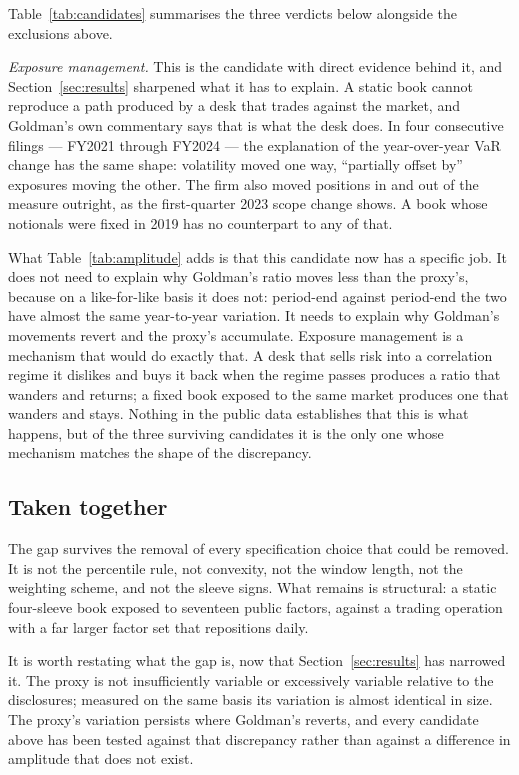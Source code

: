 Table~\ref{tab:candidates} summarises the three verdicts below alongside the
exclusions above.

\emph{Exposure management.} This is the candidate with direct evidence behind
it, and Section~\ref{sec:results} sharpened what it has to explain. A static
book cannot reproduce a path produced by a desk that trades against the market,
and Goldman's own commentary says that is what the desk does. In four
consecutive filings --- FY2021 through FY2024 --- the explanation of the
year-over-year VaR change has the same shape: volatility moved one way,
``partially offset by'' exposures moving the other. The firm also moved
positions in and out of the measure outright, as the first-quarter 2023 scope
change shows. A book whose notionals were fixed in 2019 has no counterpart to
any of that.

What Table~\ref{tab:amplitude} adds is that this candidate now has a specific
job. It does not need to explain why Goldman's ratio moves less than the
proxy's, because on a like-for-like basis it does not: period-end against
period-end the two have almost the same year-to-year variation. It needs to
explain why Goldman's movements revert and the proxy's accumulate. Exposure
management is a mechanism that would do exactly that. A desk that sells risk
into a correlation regime it dislikes and buys it back when the regime passes
produces a ratio that wanders and returns; a fixed book exposed to the same
market produces one that wanders and stays. Nothing in the public data
establishes that this is what happens, but of the three surviving candidates it
is the only one whose mechanism matches the shape of the discrepancy.



\subsection{Taken together}

The gap survives the removal of every specification choice that could be
removed. It is not the percentile rule, not convexity, not the window length,
not the weighting scheme, and not the sleeve signs. What remains is structural:
a static four-sleeve book exposed to seventeen public factors, against a
trading operation with a far larger factor set that repositions daily.

It is worth restating what the gap is, now that Section~\ref{sec:results} has
narrowed it. The proxy is not insufficiently variable or excessively variable
relative to the disclosures; measured on the same basis its variation is almost
identical in size. The proxy's variation persists where Goldman's reverts, and
every candidate above has been tested against that discrepancy rather than
against a difference in amplitude that does not exist.

